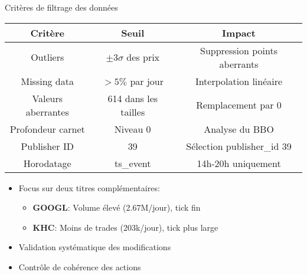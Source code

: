 \documentclass[aspectratio=169]{beamer}  %
\begin{document}
\begin{frame}{Critères de filtrage des données}
    \begin{table}
    \centering
    \begin{tabular}{|c|c|c|}
    \hline
    \textbf{Critère} & \textbf{Seuil} & \textbf{Impact} \\ \hline
    Outliers & $\pm3\sigma$ des prix & Suppression points aberrants \\ \hline
    Missing data & $>5\%$ par jour & Interpolation linéaire \\ \hline
    Valeurs aberrantes & 614 dans les tailles & Remplacement par 0 \\ \hline
    Profondeur carnet & Niveau 0 & Analyse du BBO \\ \hline
    Publisher ID & 39 & Sélection publisher\_id 39 \\ \hline
    Horodatage & ts\_event & 14h-20h uniquement \\ \hline
    \end{tabular}
    \end{table}
    \vspace{0.3cm}
    \begin{itemize}
        \item Focus sur deux titres complémentaires:
        \begin{itemize}
            \item \textbf{GOOGL}: Volume élevé (2.67M/jour), tick fin
            \item \textbf{KHC}: Moins de trades (203k/jour), tick plus large
        \end{itemize}
        \item Validation systématique des modifications
        \item Contrôle de cohérence des actions
    \end{itemize}
\end{frame}
\end{document}
